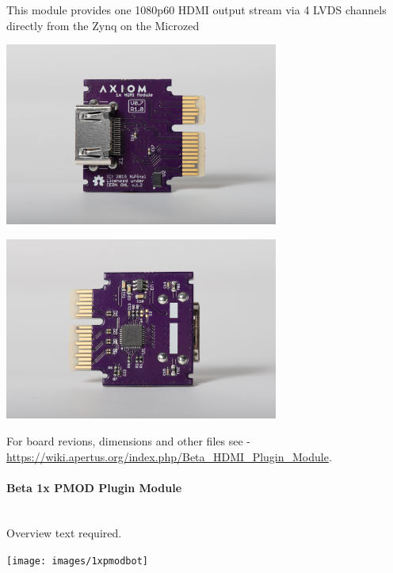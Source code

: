 This module provides one 1080p60 HDMI output stream via 4 LVDS channels directly from the Zynq on the Microzed 

\begin{center}
\includegraphics[height=6cm]{images/Axiom_Beta_Plugin_Module_1x_HDMI_v0.4_TOP}
\end{center}

\begin{center}
\includegraphics[height=6cm]{images/Axiom_Beta_Plugin_Module_1x_HDMI_v0.4_BOT}
\end{center}

For board revions, dimensions and other files see - \href{https://wiki.apertus.org/index.php/Beta_HDMI_Plugin_Module}{https://wiki.apertus.org/index.php/Beta\_HDMI\_Plugin\_Module}.\\


\paragraph{Beta 1x PMOD Plugin Module }\mbox{}\\

Overview text required.\\

\begin{center}
\texttt{[image: images/1xpmodbot]}
\end{center}

